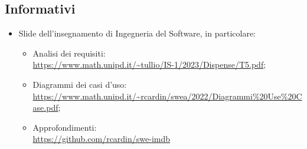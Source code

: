 \subsection{Informativi}
\begin{itemize}
    \item Slide dell’insegnamento di Ingegneria del Software, in particolare:
        \begin{itemize}
            \item Analisi dei requisiti: \\ \url{https://www.math.unipd.it/~tullio/IS-1/2023/Dispense/T5.pdf};
            \item Diagrammi dei casi d'uso:\\ \url{https://www.math.unipd.it/~rcardin/swea/2022/Diagrammi%20Use%20Case.pdf};
            \item Approfondimenti:\\ \url{https://github.com/rcardin/swe-imdb}
        \end{itemize}
\end{itemize}